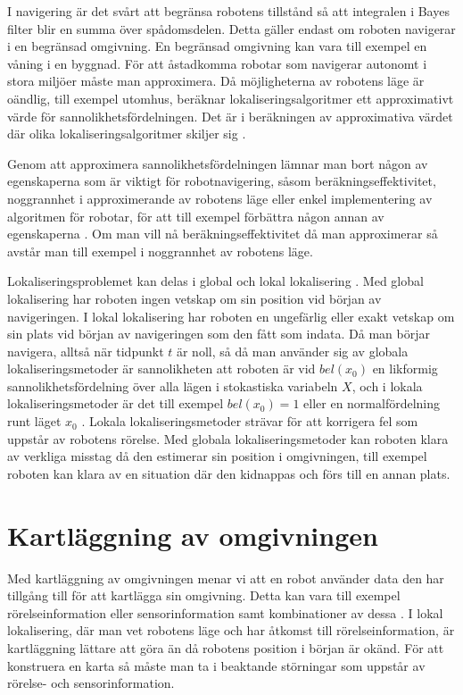 I navigering är det svårt att begränsa robotens tillstånd så att integralen i Bayes filter blir en summa över spådomsdelen. Detta gäller endast om roboten navigerar i en begränsad omgivning. En begränsad omgivning kan vara till exempel en våning i en byggnad. För att åstadkomma robotar som navigerar autonomt i stora miljöer måste man approximera. Då möjligheterna av robotens läge är oändlig, till exempel utomhus, beräknar lokaliseringsalgoritmer ett approximativt värde för sannolikhetsfördelningen. Det är i beräkningen av approximativa värdet där olika lokaliseringsalgoritmer skiljer sig \citep{ProbabilisticRobotics}.

Genom att approximera sannolikhetsfördelningen lämnar man bort någon av egenskaperna som är viktigt för robotnavigering, såsom beräkningseffektivitet, noggrannhet i approximerande av robotens läge eller enkel implementering av algoritmen för robotar, för att till exempel förbättra någon annan av egenskaperna \citep{ProbabilisticRobotics}. Om man vill nå beräkningseffektivitet då man approximerar så avstår man till exempel i noggrannhet av robotens läge.

Lokaliseringsproblemet kan delas i global och lokal lokalisering \citep{982903, globalsubmaps}. Med global lokalisering har roboten ingen vetskap om sin position vid början av navigeringen. I lokal lokalisering har roboten en ungefärlig eller exakt vetskap om sin plats vid början av navigeringen som den fått som indata. Då man börjar navigera, alltså när tidpunkt $t$ är noll, så då man använder sig av globala lokaliseringsmetoder är sannolikheten att roboten är vid $bel(x_0)$ en likformig sannolikhetsfördelning över alla lägen i stokastiska variabeln $X$, och i lokala lokaliseringsmetoder är det till exempel $bel(x_0) = 1$ eller en normalfördelning runt läget $x_0$ \citep{ProbabilisticRobotics}. Lokala lokaliseringsmetoder strävar för att korrigera fel som uppstår av robotens rörelse. Med globala lokaliseringsmetoder kan roboten klara av verkliga misstag då den estimerar sin position i omgivningen, till exempel roboten kan klara av en situation där den kidnappas och förs till en annan plats.

\section{Kartläggning av omgivningen} \label{kartlaggning}

Med kartläggning av omgivningen menar vi att en robot använder data den har tillgång till för att kartlägga sin omgivning. Detta kan vara till exempel rörelseinformation eller sensorinformation samt kombinationer av dessa \citep{ProbabilisticRobotics}. I lokal lokalisering, där man vet robotens läge och har åtkomst till rörelseinformation, är kartläggning lättare att göra än då robotens position i början är okänd. För att konstruera en karta så måste man ta i beaktande störningar som uppstår av rörelse- och sensorinformation.

